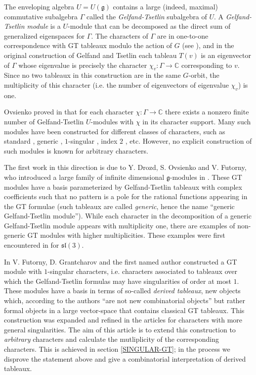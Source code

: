 \documentclass[11pt,fleqn]{article}
\newcommand\CC{\mathbb C}
\renewcommand\to{\longrightarrow}
\newcommand\g{\mathfrak g}
\begin{document}
The enveloping algebra $U = U(\g)$ contains a large (indeed, maximal) 
commutative subalgebra $\Gamma$ called the \emph{Gelfand-Tsetlin} subalgebra 
of $U$. A \emph{Gelfand-Tsetlin module} is a $U$-module that can be
decomposed as the direct sum of generalized eigenspaces for $\Gamma$.
The characters of $\Gamma$ are in one-to-one correspondence with GT tableaux 
modulo the action of $G$ (see \cite{Zh-compact-book}), and in the original 
construction of Gelfand and Tsetlin each tableau $T(v)$ is an eigenvector of 
$\Gamma$ whose eigenvalue is precisely the character $\chi_v: \Gamma \to \CC$ 
corresponding to $v$. Since no two tableaux in this construction are in the 
same $G$-orbit, the multiplicity of this character (i.e. the number of 
eigenvectors of eigenvalue $\chi_v$) is one.

Ovsienko proved in \cites{Ovs-finiteness, Ovs-strongly-nilpotent} that for 
each character $\chi: \Gamma \to \CC$ there exists a nonzero finite number of 
Gelfand-Tsetlin $U$-modules with $\chi$ in its character support. Many such 
modules have been constructed for different classes of characters, such as 
standard \cite{GT-modules}, generic \cite{DFO-GT-modules}, $1$-singular 
\cite{FGR-1-singular}, index $2$ \cite{FGR-2-index}, etc. However, no explicit 
construction of such modules is known for arbitrary characters. 

The first work in this direction is due to Y. Drozd, S. Ovsienko and V. 
Futorny, who introduced a large family of infinite dimensional $\g$-modules 
in \cite{DFO-GT-modules}. These GT modules have a basis parameterized by 
Gelfand-Tsetlin tableaux with complex coefficients such that no pattern is a 
pole for the rational functions appearing in the GT formulae (such tableaux 
are called \emph{generic}, hence the name ``generic Gelfand-Tsetlin module''). 
While each character in the decomposition of a generic Gelfand-Tsetlin module
appears with multiplicity one, there are examples of non-generic GT modules
with higher multiplicities. These examples were first encountered in 
\cites{Fut-generalization-Verma, Fut-semiprimitive} for $\mathfrak{sl}(3)$.

In \cite{FGR-1-singular} V. Futorny, D. Grantcharov and the first named author
constructed a GT module with $1$-singular characters, i.e. characters 
associated to tableaux over which the Gelfand-Tsetlin formulas may have 
singularities of order at most $1$. These modules have a basis in terms of 
so-called \emph{derived tableaux}, new objects which, according to the authors 
``are not new combinatorial objects'' but rather formal objects in a large
vector-space that contains classical GT tableaux. This construction was 
expanded and refined in the articles \cites{FGR-2-index, Zad-1-sing, 
V-geometric-singular-GT} for characters with more general singularities. The 
aim of this article is to extend this construction to \emph{arbitrary} 
characters and calculate the mutliplicity of the corresponding characters. 
This is achieved in section \ref{SINGULAR-GT}; in the process we 
disprove the statement above and give a combinatorial interpretation of 
derived tableaux. 
\end{document}
